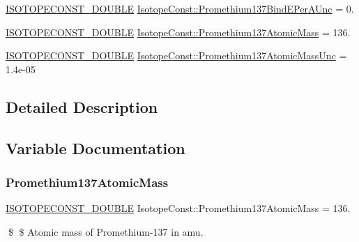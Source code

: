 \begin{DoxyCompactItemize}
\item 
\mbox{\hyperlink{group___isotope_const-_macros_ga8f45a7272ce02c0b4c65c44636ed719a}{I\+S\+O\+T\+O\+P\+E\+C\+O\+N\+S\+T\+\_\+\+D\+O\+U\+B\+LE}} \mbox{\hyperlink{group___isotope_const-_promethium-_pm137_gaa2e1557158230537bbd408e43f9ddfd3}{Isotope\+Const\+::\+Promethium137\+Bind\+E\+Per\+A\+Unc}} = 0.
\item 
\mbox{\hyperlink{group___isotope_const-_macros_ga8f45a7272ce02c0b4c65c44636ed719a}{I\+S\+O\+T\+O\+P\+E\+C\+O\+N\+S\+T\+\_\+\+D\+O\+U\+B\+LE}} \mbox{\hyperlink{group___isotope_const-_promethium-_pm137_gae1be03253c2b72bb023f2927f1cd2b14}{Isotope\+Const\+::\+Promethium137\+Atomic\+Mass}} = 136.
\item 
\mbox{\hyperlink{group___isotope_const-_macros_ga8f45a7272ce02c0b4c65c44636ed719a}{I\+S\+O\+T\+O\+P\+E\+C\+O\+N\+S\+T\+\_\+\+D\+O\+U\+B\+LE}} \mbox{\hyperlink{group___isotope_const-_promethium-_pm137_gac95b1cca334f5eb3809f234092b165e5}{Isotope\+Const\+::\+Promethium137\+Atomic\+Mass\+Unc}} = 1.\+4e-\/05
\end{DoxyCompactItemize}


\subsection{Detailed Description}


\subsection{Variable Documentation}
\mbox{\label{group___isotope_const-_promethium-_pm137_gae1be03253c2b72bb023f2927f1cd2b14}} 
\subsubsection{\texorpdfstring{Promethium137\+Atomic\+Mass}{Promethium137AtomicMass}}
{\footnotesize\ttfamily \mbox{\hyperlink{group___isotope_const-_macros_ga8f45a7272ce02c0b4c65c44636ed719a}{I\+S\+O\+T\+O\+P\+E\+C\+O\+N\+S\+T\+\_\+\+D\+O\+U\+B\+LE}} Isotope\+Const\+::\+Promethium137\+Atomic\+Mass = 136.}

\$ \$ Atomic mass of Promethium-\/137 in amu. \mbox{\label{group___isotope_const-_promethium-_pm137_gac95b1cca334f5eb3809f234092b165e5}} 
